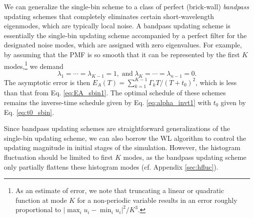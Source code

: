 \documentclass[preprint, superscriptaddress, floatfix]{revtex4-1}
\newcommand{\Err}{E}
\begin{document}
We can generalize
the single-bin scheme to a class of
perfect (brick-wall) \emph{bandpass} updating schemes
that completely eliminates certain short-wavelength eigenmodes,
which are typically local noise.
%
A bandpass updating scheme is essentially
the single-bin updating scheme
accompanied by a perfect filter
for the designated noise modes,
which are assigned with zero eigenvalues.
%
For example,
by assuming
that the PMF is so smooth
that it can be represented by the first $K$
modes,\footnote{As an estimate of error,
  we note that truncating a linear or quadratic function
  at mode $K$ for a non-periodic variable
  results in an error roughly proportional to
  $|\max_i u_i - \min_i u_i|^2/K^3$.}
we demand
%
\begin{equation}
  \lambda_1 = \cdots = \lambda_{K-1} = 1,
  \mathrm{\; and \;}
  \lambda_K = \cdots = \lambda_{n-1} = 0.
  \label{eq:lambda_bandpass}
\end{equation}
%
The asymptotic error is then
$\Err_A(T) = \sum_{ k = 1 }^{ K - 1 } \Gamma_k T/(T + t_0)^2$,
which is less than that from Eq. \eqref{eq:EA_sbin1}.
%
The optimal schedule of these schemes
remains the inverse-time schedule
given by Eq. \eqref{eq:alpha_invt1}
with $t_0$ given by Eq. \eqref{eq:t0_sbin}.
%
%

Since bandpass updating schemes are
straightforward generalizations of
the single-bin updating scheme,
we can also borrow the WL algorithm
to control the updating magnitude
in initial stages of the simulation.
%
However, the histogram fluctuation should
be limited to first $K$ modes,
as the bandpass updating scheme
only partially flattens these histogram
modes (cf. Appendix \ref{sec:hfluc}).
\end{document}
